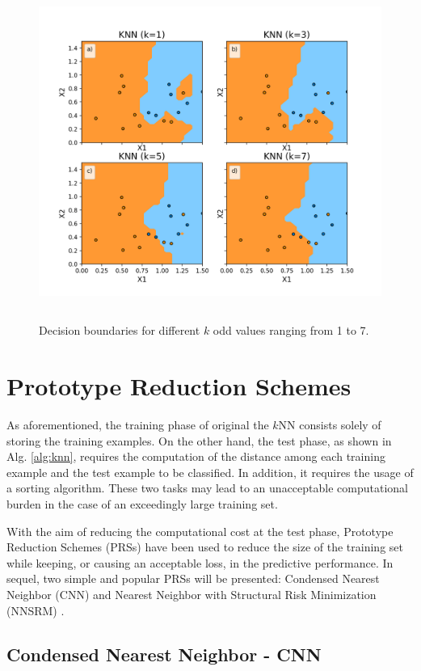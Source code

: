 \begin{figure}[h]
    \centering
    \includegraphics[height = 11cm, width =  14cm]{figures/decision_boundaries2.png}
    \caption{Decision boundaries for different $k$ odd values ranging from 1 to 7.}
    \label{fig:decisionboundaries}
\end{figure}

\section{Prototype Reduction Schemes}

As aforementioned, the training phase of original the $k$NN consists solely of storing the training examples. On the other hand, the test phase, as shown in Alg. \ref{alg:knn}, requires the computation of the distance among each training example and the test example to be classified. In addition, it requires the usage of a sorting algorithm. These two tasks may lead to an unacceptable computational burden in the case of an exceedingly large training set. 

With the aim of reducing the computational cost at the test phase, Prototype Reduction Schemes (PRSs) have been used to reduce the size of the training set while keeping, or causing an acceptable loss, in the predictive performance. In sequel, two simple and popular PRSs will be presented: Condensed Nearest Neighbor (CNN) \cite{cnn:68} and Nearest Neighbor with Structural Risk Minimization (NNSRM) \cite{nnsrm:2003}.

\subsection{Condensed Nearest Neighbor - CNN}

